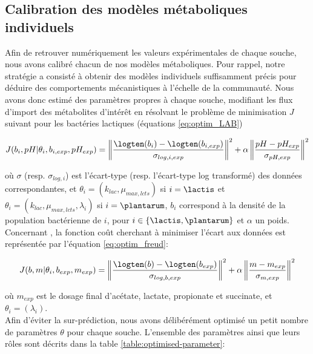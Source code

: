 \subsection{Calibration des modèles métaboliques individuels}
Afin de retrouver numériquement les valeurs expérimentales de chaque souche, nous avons calibré chacun de nos modèles métaboliques. Pour rappel, notre stratégie a consisté à obtenir des modèles individuels suffisamment précis pour déduire des comportements mécanistiques à l'échelle de la communauté. Nous avons donc estimé des paramètres propres à chaque souche, modifiant les flux d'import des métabolites d'intérêt en résolvant le problème de minimisation $J$ suivant pour les bactéries lactiques (équations \eqref{eq:optim_LAB}) 

\begin{equation}
J(b_i,pH | \theta_i, b_{i,exp},pH_{exp} ) = \left \Vert \frac{\logten(b_i) - \logten(b_{i,exp})}{\sigma_{log,i,exp}} \right \Vert^2 + \alpha \left \Vert\frac{pH - pH_{exp}}{\sigma_{pH,exp}} \right \Vert^2 
\label{eq:optim_LAB}
\end{equation}

où $\sigma$ (resp. $\sigma_{log,i}$) est l'écart-type (resp. l'écart-type log transformé) des données correspondantes, et $\theta_i = (k_{lac},\mu_{max,lcts})$ si $i=\lactis$ et $\theta_i = (k_{lac},\mu_{max,lcts},\lambda_i)$ si $i=\plantarum$, $b_i$ correspond à la densité de la population bactérienne de $i$, pour $i \in\{\lactis,\plantarum\}$ et $\alpha$ un poids.\\

Concernant \freud, la fonction coût cherchant à minimiser l'écart aux données est représentée par l’équation \eqref{eq:optim_freud}: 

\begin{equation} 
J(b,m | \theta_i, b_{exp},m_{exp} ) = \left \Vert \frac{\logten(b) - \logten(b_{exp})}{\sigma_{log,b,exp}} \right \Vert ^2 + \alpha \left \Vert \frac{m - m_{exp}}{\sigma_{m,exp}} \right \Vert^2 
\label{eq:optim_freud}
\end{equation}

où $m_{exp}$ est le dosage final d'acétate, lactate, propionate et succinate, et $\theta_i = (\lambda_i)$. \\

Afin d'éviter la sur-prédiction, nous avons délibérément optimisé un petit nombre de paramètres $\theta$ pour chaque souche. L'ensemble des paramètres ainsi que leurs rôles sont décrits dans la table \ref{table:optimised-parameter}:


